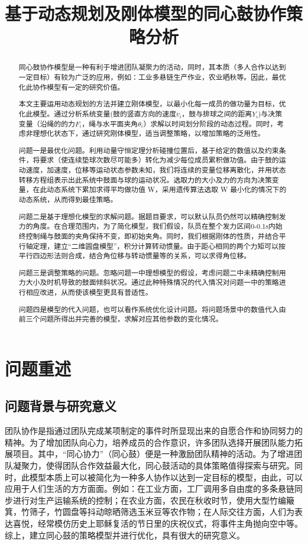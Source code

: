 \documentclass[withoutpreface,bwprint]{cumcmthesis}
\title{基于动态规划及刚体模型的同心鼓协作策略分析}
\begin{document}
 \maketitle
 \begin{abstract}
	同心鼓协作模型是一种有利于增进团队凝聚力的活动，同时，其本质（多人合作以达到一定目标）有较为广泛的应用，例如：工业多悬链生产作业，农业晒秋等。因此，最优化此协作模型有一定的研究价值。
	
	本文主要运用动态规划的方法并建立刚体模型，以最小化每一成员的做功量为目标，优化此模型。通过分析系统变量(鼓的竖直方向的速度$v_i$，鼓与排球之间的距离$Y_i$)与决策变量（沿绳的的力$F_i$，绳与水平面夹角$\theta_i$）求解以时间划分阶段的动态过程。同时，考虑非理想化状态下，通过研究刚体模型，适当调整策略，以增加策略的泛用性。
	
	问题一是最优化问题。利用动量守恒定理分析碰撞位置后，基于给定的数值以及约束条件，将要求（使连续垫球次数尽可能多）转化为减少每位成员累积做功值。由于鼓的运动速度，加速度，位移等运动状态参数未知，我们将连续的变量位移离散化，并用状态转移方程组表示出此系统中鼓面与球的运动状况。选取力的大小及力的方向为决策变量，在此动态系统下累加求得平均做功值 W，采用遗传算法选取 W 最小化的情况下的动态系统，从而得到最佳策略。
	
	问题二是基于理想化模型的求解问题。据题目要求，可以默认队员仍然可以精确控制发力的角度。在合理范围内，为了简化模型，我们假设，队员在整个发力区间0-0.1s内始终控制绳与鼓面的夹角保持不变，即初始夹角。同时，我们根据刚体的性质，并结合平行轴定理，建立“二维圆盘模型”，积分计算转动惯量。由于距心相同的两个力矩可以按平行四边形法则合成，结合角位移与转动惯量等的关系，可以求得角位移。
	
	问题三是调整策略的问题。忽略问题一中理想模型的假设，考虑问题二中未精确控制用力大小及时机导致的鼓面倾斜状况。通过此种特殊情况的代入情况对问题一中的策略进行相应改进，从而使该模型更具有普适性。
	
	问题四是模型的代入问题，也可以看作系统优化设计问题。将问题场景中的数值代入由前三个问题所得出并完善的模型，求解对应其他参数的变化情况。\\
	\vbox{} 
\end{abstract}
\newpage
\section{问题重述}
\subsection{问题背景与研究意义}
团队协作是指通过团队完成某项制定的事件时所显现出来的自愿合作和协同努力的精神。为了增加团队向心力，培养成员的合作意识，许多团队选择开展团队能力拓展项目。其中，“同心协力”（同心鼓）便是一种激励团队精神的活动。为了增进团队凝聚力，使得团队合作效益最大化，同心鼓活动的具体策略值得探索与研究。同时，此模型本质上可以被简化为一种多人协作以达到一定目标的模型，由此，可以应用于人们生活的方方面面。例如：在工业方面，工厂调用多自由度的多条悬链同步进行对生产运输系统的控制；在农业方面，农民在秋收时节，使用大型竹编簸箕，竹筛子，竹圆盘等抖动晾晒筛选玉米豆等农作物；在人际交往方面，人们为表达喜悦，经常模仿历史上耶稣复活的节日里的庆祝仪式，将事件主角抛向空中等。综上，建立同心鼓的策略模型并进行优化，具有很大的研究意义。
\end{document}
